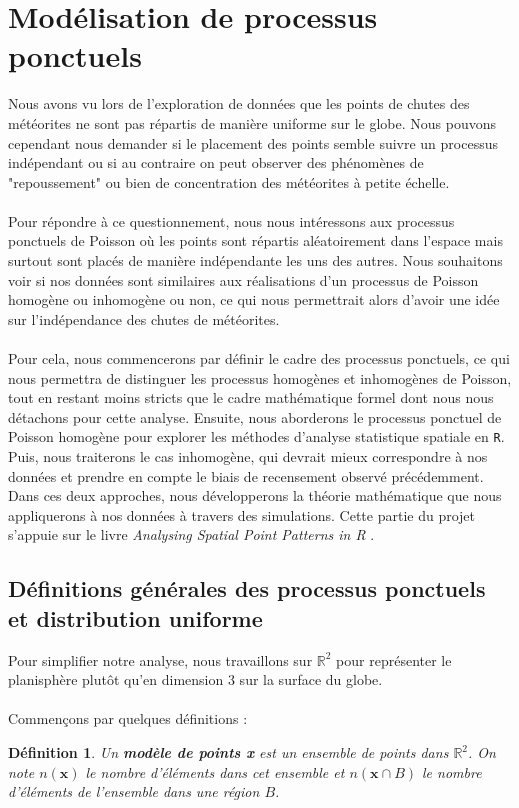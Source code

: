\documentclass[12pt]{article}
\newcommand{\R}{\mathbb{R}}
\newtheorem*{defin1}{Définition}
\begin{document}
\section{Modélisation de processus ponctuels}
Nous avons vu lors de l'exploration de données que les points de chutes des météorites ne sont pas répartis de manière uniforme sur le globe. Nous pouvons cependant nous demander si le placement des points semble suivre un processus indépendant ou si au contraire on peut observer des phénomènes de "repoussement" ou bien de concentration des météorites à petite échelle.\\
\\
Pour répondre à ce questionnement, nous nous intéressons aux processus ponctuels de Poisson où les points sont répartis aléatoirement dans l'espace mais surtout sont placés de manière indépendante les uns des autres. Nous souhaitons voir si nos données sont similaires aux réalisations d'un processus de Poisson homogène ou inhomogène ou non, ce qui nous permettrait alors d'avoir une idée sur l'indépendance des chutes de météorites.\\
\\
Pour cela, nous commencerons par définir le cadre des processus ponctuels, ce qui nous permettra de distinguer les processus homogènes et inhomogènes de Poisson, tout en restant moins stricts que le cadre mathématique formel dont nous nous détachons pour cette analyse. Ensuite, nous aborderons le processus ponctuel de Poisson homogène pour explorer les méthodes d'analyse statistique spatiale en \texttt{R}. Puis, nous traiterons le cas inhomogène, qui devrait mieux correspondre à nos données et prendre en compte le biais de recensement observé précédemment. Dans ces deux approches, nous développerons la théorie mathématique que nous appliquerons à nos données à travers des simulations. Cette partie du projet s'appuie sur le livre \textit{Analysing Spatial Point Patterns in R} \cite{analysing_spacial_points}.

\subsection{Définitions générales des processus ponctuels et distribution uniforme}
Pour simplifier notre analyse, nous travaillons sur $\R^2$ pour représenter le planisphère plutôt qu'en dimension 3 sur la surface du globe.\\
\\
Commençons par quelques définitions :

\begin{defin1}
Un \textbf{modèle de points x} est un ensemble de points dans $\R^2$. On note $n(\textbf{x})$ le nombre d'éléments dans cet ensemble et $n(\textbf{x}\cap B)$ le nombre d'éléments de l'ensemble dans une région $B$.
\end{defin1}
\end{document}
